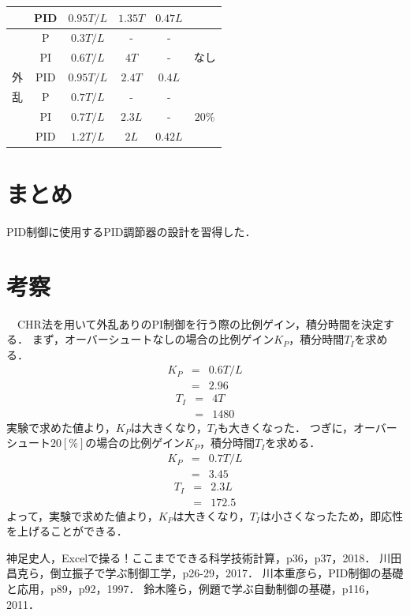 \documentclass[12pt]{jsarticle}
\begin{document}
\begin{description}
\begin{table}[H]
\begin{center}
\begin{tabular}{|c|c|c|c|c|c|}
       & PID & $0.95T/L$ & $1.35T$ & $0.47L$ &\\ \hline
       & P & $0.3T/L$ & - & - & \\
       & PI & $0.6T/L$ & $4T$ & - & なし\\
       外 & PID & $0.95T/L$ & $2.4T$ & $0.4L$ &\\ \cline{2-6}
       乱 & P & $0.7T/L$ & - & - & \\
       & PI & $0.7T/L$ & $2.3L$ & - & $20\%$\\
       & PID & $1.2T/L$ & $2L$ & $0.42L$ &\\ \hline
    \end{tabular}
  \end{center}
\end{table}
\end{description}

\section{まとめ}
PID制御に使用するPID調節器の設計を習得した．

\setcounter{section}{5}
\newpage
\section{考察}
\setcounter{page}{2}
　CHR法を用いて外乱ありのPI制御を行う際の比例ゲイン，積分時間を決定する．
まず，オーバーシュートなしの場合の比例ゲイン$K_P$，積分時間$T_I$を求める．
\begin{eqnarray}
  \label{}
  K_P &=& 0.6T/L \\
  &=& 2.96\nonumber
\end{eqnarray}
\begin{eqnarray}
  \label{}
  T_I &=& 4T \\
  &=& 1480\nonumber
\end{eqnarray}
実験で求めた値より，$K_P$は大きくなり，$T_I$も大きくなった．
つぎに，オーバーシュート$20[\%]$の場合の比例ゲイン$K_P$，積分時間$T_I$を求める．
\begin{eqnarray}
  \label{}
  K_P &=& 0.7T/L \\
  &=& 3.45\nonumber
\end{eqnarray}
\begin{eqnarray}
  \label{}
  T_I &=& 2.3L \\
  &=& 172.5\nonumber
\end{eqnarray}
よって，実験で求めた値より，$K_P$は大きくなり，$T_I$は小さくなったため，即応性を上げることができる．

\newpage
\begin{thebibliography}{9}
   神足史人，Excelで操る！ここまでできる科学技術計算，p36，p37，2018．
   川田昌克ら，倒立振子で学ぶ制御工学，p26-29，2017．
   川本重彦ら，PID制御の基礎と応用，p89，p92，1997．
   鈴木隆ら，例題で学ぶ自動制御の基礎，p116，2011．
\end{thebibliography}
\end{document}
